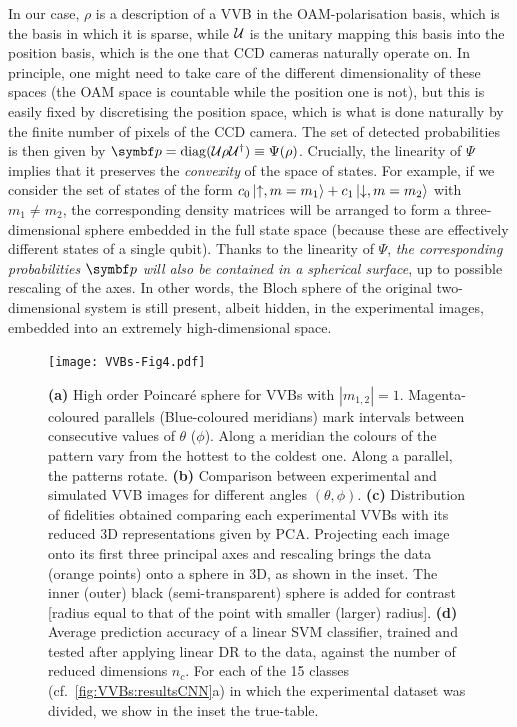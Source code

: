 In our case, $\rho$ is a description of a VVB in the OAM-polarisation basis, which is the basis in which it is sparse, while ${\mathcal{U}}$ is the unitary mapping this basis into the position basis, which is the one that CCD cameras naturally operate on. In principle, one might need to take care of the different dimensionality of these spaces (the OAM space is countable while the position one is not), but this is easily fixed by discretising the position space, which is what is done naturally by the finite number of pixels of the CCD camera. 
The set of detected probabilities is then given by $\bs p=\on{diag}(\calU\rho\calU^\dagger)\equiv\Psi(\rho)$.
Crucially, the linearity of $\Psi$ implies that it preserves the \emph{convexity} of the space of states.
For example, if we consider the set of states of the form $c_0 \ket{\uparrow,m=m_1} + c_1 \ket{\downarrow,m=m_2}$ with $m_1\neq m_2$, the corresponding density matrices will be arranged to form a three-dimensional sphere embedded in the full state space (because these are effectively different states of a single qubit).
Thanks to the linearity of $\Psi$, \emph{the corresponding probabilities $\bs p$ will also be contained in a spherical surface}, up to possible rescaling of the axes.
In other words, the Bloch sphere of the original two-dimensional system is still present, albeit hidden, in the experimental images, embedded into an extremely high-dimensional space.


\begin{figure}[tb]
    \centering
    \texttt{[image: VVBs-Fig4.pdf]}
    \caption{
		\textbf{(a)} High order Poincar\'e sphere for \acp{VVB} with $|m_{1,2}|=1$. Magenta-coloured parallels (Blue-coloured meridians) mark intervals between consecutive values of $\theta$ ($\phi$). 
		Along a meridian the colours of the pattern vary from the hottest to the coldest one. Along a parallel, the patterns rotate.
		\textbf{(b)}
		Comparison between experimental and simulated \ac{VVB} images for different angles $(\theta, \phi)$.
		\textbf{(c)}
		Distribution of fidelities obtained comparing each experimental VVBs with its reduced 3D representations given by PCA. Projecting each image onto its first three principal axes and rescaling brings the data (orange points) onto a sphere in 3D, as shown in the inset. The inner (outer) black (semi-transparent) sphere is added for contrast [radius equal to that of the point with smaller (larger) radius]. 
		\textbf{(d)}
		Average prediction accuracy of a linear \ac{SVM} classifier, trained and tested after applying linear DR to the data, against the number of reduced dimensions $n_c$.
		For each of the 15 classes (cf.~\cref{fig:VVBs:resultsCNN}a) in which the experimental dataset was divided, we show in the inset the true-table. 
    }%
    \label{fig:VVBs:PCAresults}
\end{figure}


